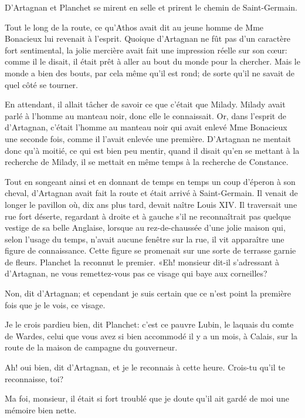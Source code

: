 D'Artagnan et Planchet se mirent en selle et prirent le chemin de Saint-Germain. 

Tout le long de la route, ce qu'Athos avait dit au jeune homme de Mme Bonacieux lui revenait à l'esprit. Quoique d'Artagnan ne fût pas d'un caractère fort sentimental, la jolie mercière avait fait une impression réelle sur son cœur: comme il le disait, il était prêt à aller au bout du monde pour la chercher. Mais le monde a bien des bouts, par cela même qu'il est rond; de sorte qu'il ne savait de quel côté se tourner. 

En attendant, il allait tâcher de savoir ce que c'était que Milady. Milady avait parlé à l'homme au manteau noir, donc elle le connaissait. Or, dans l'esprit de d'Artagnan, c'était l'homme au manteau noir qui avait enlevé Mme Bonacieux une seconde fois, comme il l'avait enlevée une première. D'Artagnan ne mentait donc qu'à moitié, ce qui est bien peu mentir, quand il disait qu'en se mettant à la recherche de Milady, il se mettait en même temps à la recherche de Constance. 

Tout en songeant ainsi et en donnant de temps en temps un coup d'éperon à son cheval, d'Artagnan avait fait la route et était arrivé à Saint-Germain. Il venait de longer le pavillon où, dix ans plus tard, devait naître Louis XIV. Il traversait une rue fort déserte, regardant à droite et à gauche s'il ne reconnaîtrait pas quelque vestige de sa belle Anglaise, lorsque au rez-de-chaussée d'une jolie maison qui, selon l'usage du temps, n'avait aucune fenêtre sur la rue, il vit apparaître une figure de connaissance. Cette figure se promenait sur une sorte de terrasse garnie de fleurs. Planchet la reconnut le premier. «Eh! monsieur dit-il s'adressant à d'Artagnan, ne vous remettez-vous pas ce visage qui baye aux corneilles? 

\speak  Non, dit d'Artagnan; et cependant je suis certain que ce n'est point la première fois que je le vois, ce visage. 

\speak  Je le crois pardieu bien, dit Planchet: c'est ce pauvre Lubin, le laquais du comte de Wardes, celui que vous avez si bien accommodé il y a un mois, à Calais, sur la route de la maison de campagne du gouverneur. 

\speak  Ah! oui bien, dit d'Artagnan, et je le reconnais à cette heure. Crois-tu qu'il te reconnaisse, toi? 

\speak  Ma foi, monsieur, il était si fort troublé que je doute qu'il ait gardé de moi une mémoire bien nette. 

